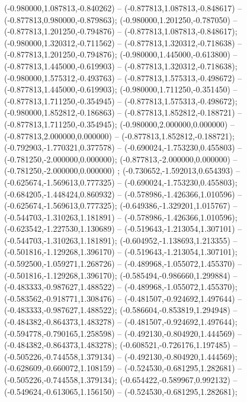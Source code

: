  (-0.980000,1.087813,-0.840262) -- (-0.877813,1.087813,-0.848617) -- (-0.877813,0.980000,-0.879863);
 (-0.980000,1.201250,-0.787050) -- (-0.877813,1.201250,-0.794876) -- (-0.877813,1.087813,-0.848617);
 (-0.980000,1.320312,-0.711562) -- (-0.877813,1.320312,-0.718638) -- (-0.877813,1.201250,-0.794876);
 (-0.980000,1.445000,-0.613800) -- (-0.877813,1.445000,-0.619903) -- (-0.877813,1.320312,-0.718638);
 (-0.980000,1.575312,-0.493763) -- (-0.877813,1.575313,-0.498672) -- (-0.877813,1.445000,-0.619903);
 (-0.980000,1.711250,-0.351450) -- (-0.877813,1.711250,-0.354945) -- (-0.877813,1.575313,-0.498672);
 (-0.980000,1.852812,-0.186863) -- (-0.877813,1.852812,-0.188721) -- (-0.877813,1.711250,-0.354945);
 (-0.980000,2.000000,0.000000) -- (-0.877813,2.000000,0.000000) -- (-0.877813,1.852812,-0.188721);
 (-0.792903,-1.770321,0.377578) -- (-0.690024,-1.753230,0.455803) -- (-0.781250,-2.000000,0.000000);
 (-0.877813,-2.000000,0.000000) -- (-0.781250,-2.000000,0.000000) ;
 (-0.730652,-1.592013,0.654393) -- (-0.625674,-1.569613,0.777325) -- (-0.690024,-1.753230,0.455803);
 (-0.684205,-1.448424,0.860932) -- (-0.578986,-1.426366,1.010596) -- (-0.625674,-1.569613,0.777325);
 (-0.649386,-1.329201,1.015767) -- (-0.544703,-1.310263,1.181891) -- (-0.578986,-1.426366,1.010596);
 (-0.623542,-1.227530,1.130689) -- (-0.519643,-1.213054,1.307101) -- (-0.544703,-1.310263,1.181891);
 (-0.604952,-1.138693,1.213355) -- (-0.501816,-1.129268,1.396170) -- (-0.519643,-1.213054,1.307101);
 (-0.592500,-1.059271,1.268726) -- (-0.489968,-1.055072,1.455370) -- (-0.501816,-1.129268,1.396170);
 (-0.585494,-0.986660,1.299884) -- (-0.483333,-0.987627,1.488522) -- (-0.489968,-1.055072,1.455370);
 (-0.583562,-0.918771,1.308476) -- (-0.481507,-0.924692,1.497644) -- (-0.483333,-0.987627,1.488522);
 (-0.586604,-0.853819,1.294948) -- (-0.484382,-0.864373,1.483278) -- (-0.481507,-0.924692,1.497644);
 (-0.594778,-0.790165,1.258598) -- (-0.492130,-0.804920,1.444569) -- (-0.484382,-0.864373,1.483278);
 (-0.608521,-0.726176,1.197485) -- (-0.505226,-0.744558,1.379134) -- (-0.492130,-0.804920,1.444569);
 (-0.628609,-0.660072,1.108159) -- (-0.524530,-0.681295,1.282681) -- (-0.505226,-0.744558,1.379134);
 (-0.654422,-0.589967,0.992132) -- (-0.549624,-0.613065,1.156150) -- (-0.524530,-0.681295,1.282681);
